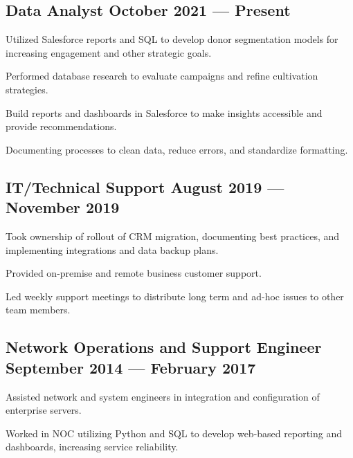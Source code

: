 \subsection{{Data Analyst \hfill October 2021 --- Present}}
\begin{zitemize}
\item Utilized Salesforce reports and SQL to develop donor segmentation models for increasing engagement and other strategic goals.
\item Performed database research to evaluate campaigns and refine cultivation strategies.
\item Build reports and dashboards in Salesforce to make insights accessible and provide recommendations.
\item Documenting processes to clean data, reduce errors, and standardize formatting.
\end{zitemize}

\subsection{{IT/Technical Support \hfill August 2019 --- November 2019}}
\begin{zitemize}
\item Took ownership of rollout of CRM migration, documenting best practices, and implementing integrations and data backup plans.
\item Provided on-premise and remote business customer support.
\item Led weekly support meetings to distribute long term and ad-hoc issues to other team members.
\end{zitemize}

\subsection{{Network Operations and Support Engineer  \hfill September 2014 --- February 2017}}
\begin{zitemize}
\item Assisted network and system engineers in integration and configuration of enterprise servers.
\item Worked in NOC utilizing Python and SQL to develop web-based reporting and dashboards, increasing service reliability.
\end{zitemize}

